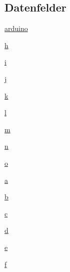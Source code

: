 \subsection*{Datenfelder}
\begin{DoxyCompactItemize}
\item 
\hyperlink{class_f_i_n_a_l___g_u_i___w_l_a_n_1_1_w_l_a_n_a3f424772edaa120b12bda2b9addc2bf5}{arduino}
\item 
\hyperlink{class_f_i_n_a_l___g_u_i___w_l_a_n_1_1_w_l_a_n_a5e36941b3d856737e81516acd45edc50}{h}
\item 
\hyperlink{class_f_i_n_a_l___g_u_i___w_l_a_n_1_1_w_l_a_n_a7e98b8a17c0aad30ba64d47b74e2a6c1}{i}
\item 
\hyperlink{class_f_i_n_a_l___g_u_i___w_l_a_n_1_1_w_l_a_n_abf2bc2545a4a5f5683d9ef3ed0d977e0}{j}
\item 
\hyperlink{class_f_i_n_a_l___g_u_i___w_l_a_n_1_1_w_l_a_n_adc468c70fb574ebd07287b38d0d0676d}{k}
\item 
\hyperlink{class_f_i_n_a_l___g_u_i___w_l_a_n_1_1_w_l_a_n_a5b54c0a045f179bcbbbc9abcb8b5cd4c}{l}
\item 
\hyperlink{class_f_i_n_a_l___g_u_i___w_l_a_n_1_1_w_l_a_n_ab3cd915d758008bd19d0f2428fbb354a}{m}
\item 
\hyperlink{class_f_i_n_a_l___g_u_i___w_l_a_n_1_1_w_l_a_n_aeab71244afb687f16d8c4f5ee9d6ef0e}{n}
\item 
\hyperlink{class_f_i_n_a_l___g_u_i___w_l_a_n_1_1_w_l_a_n_ae47ca7a09cf6781e29634502345930a7}{o}
\item 
\hyperlink{class_f_i_n_a_l___g_u_i___w_l_a_n_1_1_w_l_a_n_a4124bc0a9335c27f086f24ba207a4912}{a}
\item 
\hyperlink{class_f_i_n_a_l___g_u_i___w_l_a_n_1_1_w_l_a_n_a21ad0bd836b90d08f4cf640b4c298e7c}{b}
\item 
\hyperlink{class_f_i_n_a_l___g_u_i___w_l_a_n_1_1_w_l_a_n_ae0323a9039add2978bf5b49550572c7c}{c}
\item 
\hyperlink{class_f_i_n_a_l___g_u_i___w_l_a_n_1_1_w_l_a_n_a1aabac6d068eef6a7bad3fdf50a05cc8}{d}
\item 
\hyperlink{class_f_i_n_a_l___g_u_i___w_l_a_n_1_1_w_l_a_n_a08a4415e9d594ff960030b921d42b91e}{e}
\item 
\hyperlink{class_f_i_n_a_l___g_u_i___w_l_a_n_1_1_w_l_a_n_a633de4b0c14ca52ea2432a3c8a5c4c31}{f}
\end{DoxyCompactItemize}
